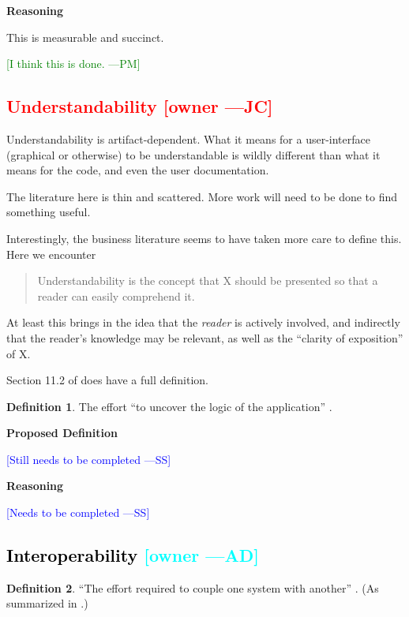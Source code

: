 \documentclass[letterpaper,cleveref]{lipics-v2019}
\newcommand{\authornote}[3]{\textcolor{#1}{[#3 ---#2]}}
\newcommand{\authornote}[3]{}
\newcommand{\wss}[1]{\authornote{blue}{SS}{#1}} %
\newcommand{\jc}[1]{\authornote{red}{JC}{#1}} %
\newcommand{\pmi}[1]{\authornote{green}{PM}{#1}} %
\newcommand{\ad}[1]{\authornote{cyan}{AD}{#1}} %
\newcommand{\notdone}[1]{\textcolor{red}{#1}}
\newcommand{\done}[1]{\textcolor{black}{#1}}
\theoremstyle{definition}
\newtheorem{defn}{Definition}
\begin{document}
\noindent \textbf{Reasoning}

This is measurable and succinct. 

\pmi{I think this is done.}

\subsection{\notdone{Understandability} \jc{owner}}

Understandability is artifact-dependent. What it means for a user-interface (graphical
or otherwise) to be understandable is wildly different than what it means for the code,
and even the user documentation.

The literature here is thin and scattered.  More work will need to be done to find
something useful.

Interestingly, the business literature seems to have taken more care to define this.
Here we encounter
\begin{quote}
Understandability is the concept that X should be presented
so that a reader can easily comprehend it.
\end{quote}
At least this brings in the idea that the \emph{reader} is actively involved, and
indirectly that the reader's knowledge may be relevant, as well as the
``clarity of exposition'' of X.

Section 11.2 of \citet{adams2015nonfunctional} does have a full definition.

\begin{defn}
The effort ``to uncover the logic of the application''
\citep{ghezzi1991fundamentals}.
\end{defn}

\noindent \textbf{Proposed Definition}

\wss{Still needs to be completed}

\noindent \textbf{Reasoning}

\wss{Needs to be completed}

\subsection{\done{Interoperability} \ad{owner}}

\begin{defn}
  ``The effort required to couple one system with another''
  \citep{McCallEtAl1977}. (As summarized in \citet{VanVliet2000}.)
\end{defn}
\end{document}
